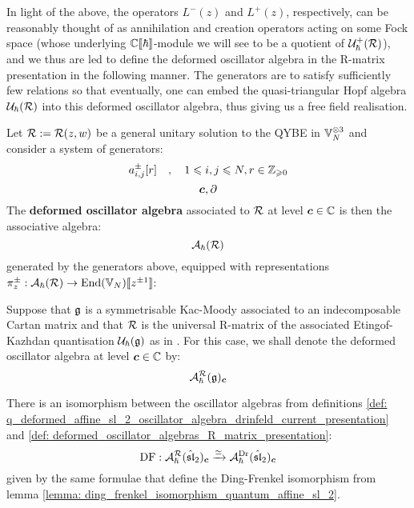         In light of the above, the operators $L^-(z)$ and $L^+(z)$, respectively, can be reasonably thought of as annihilation and creation operators acting on some Fock space (whose underlying $\mathbb{C}[\![\hbar]\!]$-module we will see to be a quotient of $\mathcal{U}_{\hbar}^+(\mathcal{R})$), and we thus are led to define the deformed oscillator algebra in the R-matrix presentation in the following manner. The generators are to satisfy sufficiently few relations so that eventually, one can embed the quasi-triangular Hopf algebra $\mathcal{U}_{\hbar}(\mathcal{R})$ into this deformed oscillator algebra, thus giving us a free field realisation.
        \begin{definition} \label{def: deformed_oscillator_algebras_R_matrix_presentation}
            Let $\mathcal{R} := \mathcal{R}(z, w)$ be a general unitary solution to the QYBE in $\bbV_N^{\tensor 3}$ and consider a system of generators:
                $$a^{\pm}_{i, j}[r] \quad, \quad 1 \leqslant i, j \leqslant N, r \in \mathbb{Z}_{\geqslant 0}$$
                $$\boldsymbol{c}, \partial$$
            The \textbf{deformed oscillator algebra} associated to $\mathcal{R}$ at level $\boldsymbol{c} \in \mathbb{C}$ is then the associative algebra:
                $$\mathcal{A}_{\hbar}(\mathcal{R})$$
            generated by the generators above, equipped with representations $\pi_z^{\pm}: \mathcal{A}_{\hbar}(\mathcal{R}) \to \operatorname{End}(\mathbb{V}_N)[\![z^{\pm 1}]\!]$:
        \end{definition}
        \begin{convention}
            Suppose that $\mathfrak{g}$ is a symmetrisable Kac-Moody associated to an indecomposable Cartan matrix and that $\mathcal{R}$ is the universal R-matrix of the associated Etingof-Kazhdan quantisation $\mathcal{U}_{\hbar}(\mathfrak{g})$ as in \cite{etingof_kazhdan_quantisation_6}. For this case, we shall denote the deformed oscillator algebra at level $\boldsymbol{c} \in \mathbb{C}$ by:
                $$\mathcal{A}_{\hbar}^{\mathcal{R}}(\mathfrak{g})_{\boldsymbol{c}}$$
        \end{convention}
        \begin{lemma} \label{lemma: ding_frenkel_isomorphism_oscillator_algebras}
            There is an isomorphism between the oscillator algebras from definitions \ref{def: q_deformed_affine_sl_2_oscillator_algebra_drinfeld_current_presentation} and \ref{def: deformed_oscillator_algebras_R_matrix_presentation}:
                $$\operatorname{DF}: \mathcal{A}_{\hbar}^{\mathcal{R}}(\hat{\mathfrak{sl}}_2)_{\boldsymbol{c}} \xrightarrow[]{\simeq} \mathcal{A}_{\hbar}^{\mathrm{Dr}}(\hat{\mathfrak{sl}}_2)_{\boldsymbol{c}}$$
            given by the same formulae that define the Ding-Frenkel isomorphism from lemma \ref{lemma: ding_frenkel_isomorphism_quantum_affine_sl_2}.
        \end{lemma}
